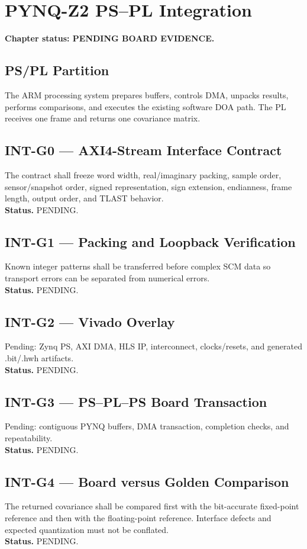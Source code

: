 \chapter{PYNQ-Z2 PS--PL Integration}
\label{ch:pynq-integration}
\textbf{Chapter status: PENDING BOARD EVIDENCE.}

\section{PS/PL Partition}
The ARM processing system prepares buffers, controls DMA, unpacks results, performs
comparisons, and executes the existing software DOA path. The PL receives one frame and
returns one covariance matrix.

\section{INT-G0 --- AXI4-Stream Interface Contract}
The contract shall freeze word width, real/imaginary packing, sample order, sensor/snapshot
order, signed representation, sign extension, endianness, frame length, output order, and
TLAST behavior.\\
\textbf{Status.} PENDING.

\section{INT-G1 --- Packing and Loopback Verification}
Known integer patterns shall be transferred before complex SCM data so transport errors can
be separated from numerical errors.\\
\textbf{Status.} PENDING.

\section{INT-G2 --- Vivado Overlay}
Pending: Zynq PS, AXI DMA, HLS IP, interconnect, clocks/resets, and generated .bit/.hwh
artifacts.\\
\textbf{Status.} PENDING.

\section{INT-G3 --- PS--PL--PS Board Transaction}
Pending: contiguous PYNQ buffers, DMA transaction, completion checks, and repeatability.\\
\textbf{Status.} PENDING.

\section{INT-G4 --- Board versus Golden Comparison}
The returned covariance shall be compared first with the bit-accurate fixed-point reference
and then with the floating-point reference. Interface defects and expected quantization must
not be conflated.\\
\textbf{Status.} PENDING.
